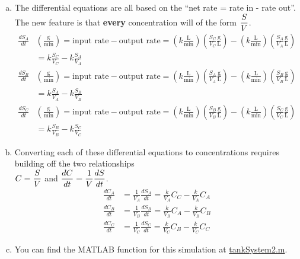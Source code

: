 \begin{enumerate}[1.]
\begin{Solution}
  \begin{enumerate}[(a)]
  \item The differential equations are all based on the ``net rate =
    rate in - rate out''.  The new feature is that {\bf every}
    concentration will of the form $\displaystyle \frac{S}{V}$.
  \begin{align*}
    \frac{dS_A}{dt} &  \left(\frac{\text{g}}{\text{min}} \right) = \text{input rate} - \text{output rate} = 
 \left( k \frac{\text{L}}{\text{min}} \right)
\left( \frac{S_C}{V_C} \frac{\text{g}}{\text{L}} \right) 
- \left( k \frac{\text{L}}{\text{min}} \right)
\left( \frac{S_A}{V_A} \frac{\text{g}}{\text{L}} \right)  \\
& = k \frac{S_C}{V_C} - k \frac{S_A}{V_A}  \\
    \frac{dS_B}{dt} &  \left(\frac{\text{g}}{\text{min}} \right) = \text{input rate} - \text{output rate} = 
 \left( k \frac{\text{L}}{\text{min}} \right)
\left( \frac{S_A}{V_A} \frac{\text{g}}{\text{L}} \right) 
- \left( k \frac{\text{L}}{\text{min}} \right)
\left( \frac{S_B}{V_B} \frac{\text{g}}{\text{L}} \right)  \\
& = k \frac{S_A}{V_A} - k \frac{S_B}{V_B}  \\
    \frac{dS_C}{dt} &  \left(\frac{\text{g}}{\text{min}} \right) = \text{input rate} - \text{output rate} = 
 \left( k \frac{\text{L}}{\text{min}} \right)
\left( \frac{S_B}{V_B} \frac{\text{g}}{\text{L}} \right) 
- \left( k \frac{\text{L}}{\text{min}} \right)
\left( \frac{S_C}{V_C} \frac{\text{g}}{\text{L}} \right)  \\
& = k \frac{S_B}{V_B} - k \frac{S_C}{V_C}  
  \end{align*}
\item Converting each of these differential equations to concentrations requires building off the two relationships \\
$\displaystyle  C = \frac{S}{V}$ and $\displaystyle \frac{dC}{dt} = \frac{1}{V} \frac{dS}{dt}$.
\begin{align*}
    \frac{dC_A}{dt} 
& = \frac{1}{V_A} \frac{dS_A}{dt}
 = \frac{k}{V_A} C_C - \frac{k}{V_A} C_A \\
    \frac{dC_B}{dt} 
& = \frac{1}{V_B} \frac{dS_B}{dt}
 = \frac{k}{V_B} C_A - \frac{k}{V_B} C_B \\
    \frac{dC_C}{dt} 
& = \frac{1}{V_C} \frac{dS_C}{dt}
 = \frac{k}{V_C} C_B - \frac{k}{V_C} C_C 
\end{align*}

\item You can find the MATLAB function for this simulation at 
\href{http://www.mast.queensu.ca/~apsc171/MNTCP01/PracticeProblems/MATLAB/tankSystem2.m}{tankSystem2.m}. 


\end{enumerate}
\end{Solution}
\end{enumerate}
